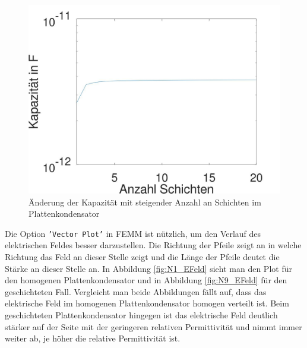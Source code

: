 \begin{figure}[tpbh]
	\centering
	\includegraphics[width=.8\textwidth]{data/Kapazitaet}
	\caption{Änderung der Kapazität mit steigender Anzahl an Schichten im Plattenkondensator}
	\label{fig:semilogy}
\end{figure}


Die Option \texttt{'Vector Plot'} in FEMM ist nützlich, um den Verlauf des elektrischen Feldes besser darzustellen. Die Richtung der Pfeile zeigt an in welche Richtung das Feld an dieser Stelle zeigt und die Länge der Pfeile deutet die Stärke an dieser Stelle an.
\newpage
In Abbildung \ref{fig:N1_EFeld} sieht man den Plot für den homogenen Plattenkondensator und in Abbildung \ref{fig:N9_EFeld} für den geschichteten Fall. Vergleicht man beide Abbildungen fällt auf, dass das elektrische Feld im homogenen Plattenkondensator homogen verteilt ist. Beim geschichteten Plattenkondensator hingegen ist das elektrische Feld deutlich stärker auf der Seite mit der geringeren relativen Permittivität und nimmt immer weiter ab, je höher die relative Permittivität ist.

